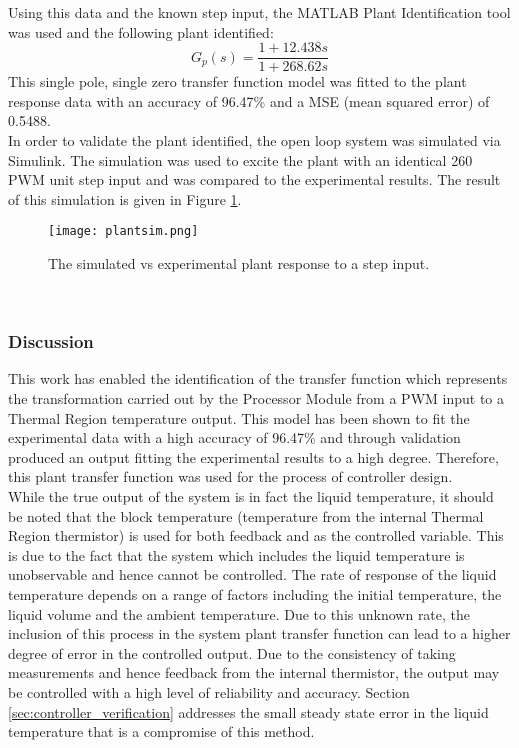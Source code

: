 Using this data and the known step input, the MATLAB Plant Identification tool was used and the following plant identified:
$$ G_p(s) = \frac{1 + 12.438s}{1 + 268.62s} $$
This single pole, single zero transfer function model was fitted to the plant response data with an accuracy of 96.47\% and a MSE (mean squared error) of 0.5488.\\

In order to validate the plant identified, the open loop system was simulated via Simulink. The simulation was used to excite the plant with an identical 260 PWM unit step input and was compared to the experimental results. The result of this simulation is given in Figure \ref{fig:plantsim]}.

\begin{figure}[!htb]
	\centering
	\texttt{[image: plantsim.png]}
	\caption[Plant validation simulation.]{The simulated vs experimental plant response to a step input.}
	\label{fig:plantsim]}
\end{figure} 
\FloatBarrier

\subsubsection{Discussion}

This work has enabled the identification of the transfer function which represents the transformation carried out by the Processor Module from a PWM input to a Thermal Region temperature output. This model has been shown to fit the experimental data with a high accuracy of 96.47\% and through validation produced an output fitting the experimental results to a high degree. Therefore, this plant transfer function was used for the process of controller design.\\

While the true output of the system is in fact the liquid temperature, it should be noted that the block temperature (temperature from the internal Thermal Region thermistor) is used for both feedback and as the controlled variable. This is due to the fact that the system which includes the liquid temperature is unobservable and hence cannot be controlled. The rate of response of the liquid temperature depends on a range of factors including the initial temperature, the liquid volume and the ambient temperature. Due to this unknown rate, the inclusion of this process in the system plant transfer function can lead to a higher degree of error in the controlled output. Due to the consistency of taking measurements and hence feedback from the internal thermistor, the output may be controlled with a high level of reliability and accuracy. Section \ref{sec:controller_verification} addresses the small steady state error in the liquid temperature that is a compromise of this method.

